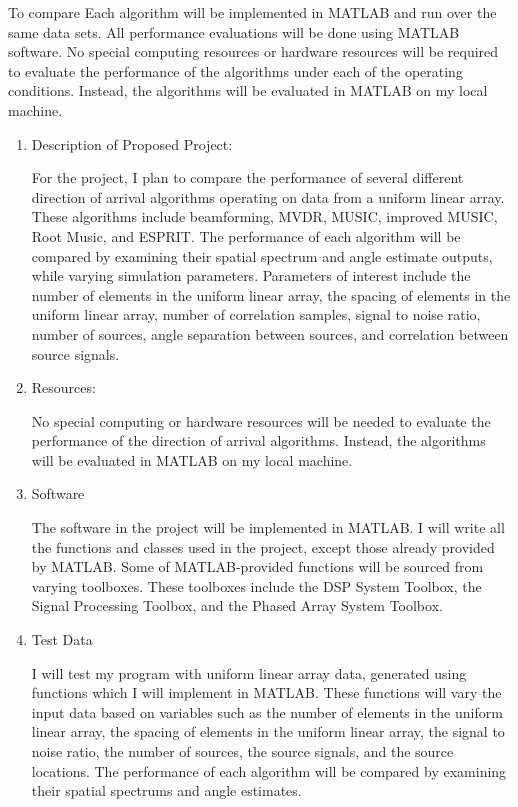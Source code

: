 \documentclass{article}
\begin{document}
	
	
	To compare Each algorithm will be implemented in MATLAB and run over the same data sets. 
	All performance evaluations will be done using MATLAB software.  No special computing resources or hardware resources will be required to evaluate the performance of the algorithms under each of the operating conditions. Instead, the algorithms will be evaluated in MATLAB on my local machine.
	
	\begin{enumerate}
		\item Description of Proposed Project:
		
			For the project, I plan to compare the performance of several different direction of arrival algorithms operating on data from a uniform linear array. These algorithms include beamforming, MVDR, MUSIC, improved MUSIC, Root Music, and ESPRIT. The performance of each algorithm will be compared by examining their spatial spectrum and angle estimate outputs, while varying simulation parameters. Parameters of interest include the number of elements in the uniform linear array, the spacing of elements in the uniform linear array, number of correlation samples, signal to noise ratio, number of sources, angle separation between sources, and correlation between source signals. 
			
		\item Resources:
		
			No special computing or hardware resources will be needed to evaluate the performance of the direction of arrival algorithms. Instead, the algorithms will be evaluated in MATLAB on my local machine.
			
		\item Software
		
			The software in the project will be implemented in MATLAB. I will write all the functions and classes used in the project, except those already provided by MATLAB. Some of MATLAB-provided functions will be sourced from varying toolboxes. These toolboxes include the DSP System Toolbox, the Signal Processing Toolbox, and the Phased Array System Toolbox.
			
		\item Test Data	
			
			I will test my program with uniform linear array data, generated using functions which I will implement in MATLAB. These functions will vary the input data based on variables such as the number of elements in the uniform linear array, the spacing of elements in the uniform linear array, the signal to noise ratio, the number of sources, the source signals, and the source locations. The performance of each algorithm will be compared by examining their spatial spectrums and angle estimates.
			
	\end{enumerate}	
	
\end{document}
